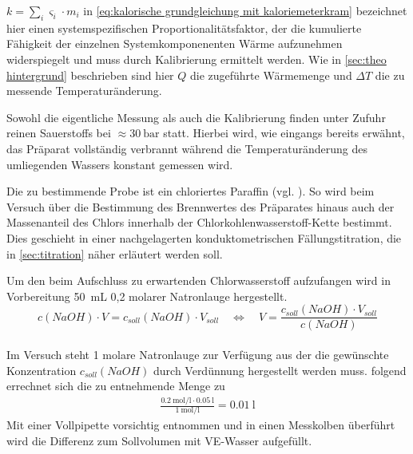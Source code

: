 		\(k = \sum_i \varsigma_i \cdot m_i\) in \cref{eq:kalorische grundgleichung mit kaloriemeterkram} bezeichnet hier einen systemspezifischen Proportionalitätsfaktor, der die kumulierte
		Fähigkeit der einzelnen Systemkomponenenten Wärme aufzunehmen widerspiegelt und muss durch Kalibrierung ermittelt werden. Wie in \cref{sec:theo hintergrund} beschrieben sind hier \(Q\)
		die zugeführte Wärmemenge und \(\Delta T\) die zu messende Temperaturänderung.
		
		Sowohl die eigentliche Messung als auch die Kalibrierung finden unter Zufuhr reinen Sauerstoffs bei \(\approx \SI{30}{\bar}\) statt. Hierbei wird, wie eingangs bereits erwähnt, das Präparat
		vollständig verbrannt während die Temperaturänderung des umliegenden Wassers konstant gemessen wird.\par\medskip
		
		Die zu bestimmende Probe ist ein chloriertes Paraffin (vgl. ). So wird beim Versuch über die Bestimmung des Brennwertes des
		Präparates hinaus auch der Massenanteil des Chlors innerhalb der Chlorkohlenwasserstoff-Kette bestimmt. Dies geschieht in einer nachgelagerten konduktometrischen Fällungstitration, die in \cref{sec:titration}
		näher erläutert werden soll.\par\medskip
		Um den beim Aufschluss zu erwartenden Chlorwasserstoff aufzufangen wird in Vorbereitung \SI{50}{mL} 0,2 molarer Natronlauge hergestellt.
		\begin{equation}
			c(NaOH) \cdot V = c_{soll}(NaOH) \cdot V_{soll} \quad \Leftrightarrow \quad V = \frac{c_{soll}(NaOH) \cdot V_{soll}}{c(NaOH)}
			\label{eq:verduennung}
		\end{equation}\\
		Im Versuch steht 1 molare Natronlauge zur Verfügung aus der die gewünschte Konzentration \(c_{soll}(NaOH)\) durch Verdünnung hergestellt werden muss.
		 folgend errechnet sich die zu entnehmende Menge zu
		\begin{align}
			\frac{\SI{0,2}{\mole\per\litre} \cdot \SI{0,05}{\litre}}{\SI{1}{\mole\per\litre}} = \SI{0,01}{\litre}
		\end{align}
		Mit einer Vollpipette vorsichtig entnommen und in einen Messkolben überführt wird die Differenz zum Sollvolumen mit VE-Wasser aufgefüllt.\par\medskip
